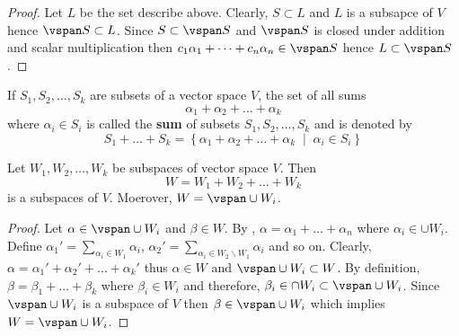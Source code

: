 \begin{proof}
    Let \(L\) be the set describe above. Clearly, \(S \subset L\) and \(L\) is a subsapce of \(V\) hence \(\vspan S \subset L\). Since \(S \subset \vspan S\) and \(\vspan S\) is closed under addition and scalar multiplication then \( c_1 \alpha_1 + \dots + c_n \alpha_n \in \vspan S\) hence \(L \subset \vspan S\).
\end{proof}

\begin{definition}
    If \(S_1, S_2, \dots , S_k\) are subsets of a vector space \(V\), the set of all sums
    \begin{equation*}
        \alpha_1 + \alpha_2 + \dots + \alpha_k
    \end{equation*}
    where \(\alpha_i \in S_i\) is called the \textbf{sum} of subsets \(S_1, S_2, \dots , S_k\) and is denoted by
    \begin{equation*}
        S_1 + \dots + S_k = \left \{\alpha_1 + \alpha_2 + \dots + \alpha_k \; \middle | \; \alpha_i \in S_i \right \}
    \end{equation*}
\end{definition}

\begin{theorem}
    Let \(W_1, W_2, \dots , W_k\) be subspaces of vector space \(V\). Then
    \begin{equation*}
        W = W_1 + W_2 + \dots + W_k
    \end{equation*}
    is a subspaces of \(V\). Moerover, \( W = \vspan \cup W_i \).
\end{theorem}

\begin{proof}
    Let \(\alpha \in \vspan \cup W_i\) and \(\beta \in W\). By , \(\alpha = \alpha_1 + \dots + \alpha_n\) where \(\alpha_i \in \cup W_i\). Define \(\alpha_1 ' = \sum _{\alpha_i \in W_1} \alpha_i\), \(\alpha_2' = \sum_{\alpha_i \in W_2 \backslash W_1} \alpha_i\) and so on. Clearly, \(\alpha = \alpha_1' + \alpha_2' + \dots + \alpha_k'\) thus \(\alpha \in W\) and \(\vspan \cup W_i \subset W\).
    By definition, \(\beta = \beta_1 + \dots + \beta_k\) where \(\beta_i \in W_i\) and therefore, \(\beta_i \in \cap W_i \subset \vspan \cup W_i\). Since \(\vspan \cup W_i\) is a subspace of \(V\) then \(\beta \in \vspan \cup W_i\) which implies \(W = \vspan \cup W_i\).
\end{proof}

